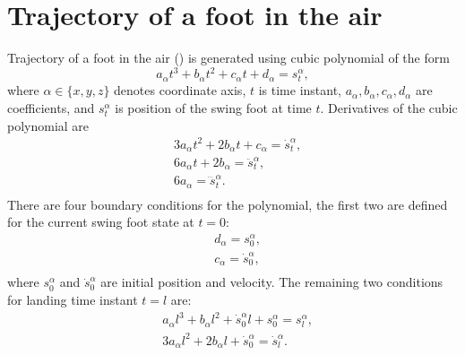 \chapter{Trajectory of a foot in the air}
\label{app.swing_foot}
\acresetall

Trajectory of a foot in the air () is generated using cubic
polynomial of the form
%
\begin{equation}
    a_{\alpha} t^3 + b_{\alpha} t^2 + c_{\alpha}t + d_{\alpha} = s^{\alpha}_t,
\end{equation}
%
where $\alpha \in \{x,y,z\}$ denotes coordinate axis, $t$ is time instant,
$a_{\alpha},b_{\alpha},c_{\alpha},d_{\alpha}$ are coefficients, and
$s^{\alpha}_t$ is position of the swing foot at time $t$. Derivatives of the
cubic polynomial are
%
\begin{equation}\label{eq.swtraj_derivatives}
\begin{split}
    & 3a_{\alpha} t^2 + 2b_{\alpha} t + c_{\alpha} = \dot{s}^{\alpha}_t,\\
    & 6a_{\alpha} t + 2b_{\alpha} = \ddot{s}^{\alpha}_t,\\
    & 6a_{\alpha} = \dddot{s}^{\alpha}_t.\\
\end{split}
\end{equation}
%
There are four boundary conditions for the polynomial, the first two are
defined for the current swing foot state at $t = 0$:
%
\begin{equation}\label{eq.swtraj_bc1}
\begin{split}
    & d_{\alpha} = s^{\alpha}_0, \\
    & c_{\alpha} = \dot{s}^{\alpha}_0, \\
\end{split}
\end{equation}
%
where $s^{\alpha}_0$ and $\dot{s}^{\alpha}_0$ are initial position and
velocity. The remaining two conditions for landing time instant $t = l$ are:
%
\begin{equation}\label{eq.swtraj_bc2}
\begin{split}
    & a_{\alpha} l^3 + b_{\alpha} l^2 + \dot{s}^{\alpha}_0 l + s^{\alpha}_0 = s^{\alpha}_l,\\
    & 3a_{\alpha} l^2 + 2b_{\alpha} l + \dot{s}^{\alpha}_0 = \dot{s}^{\alpha}_l.
\end{split}
\end{equation}
%


